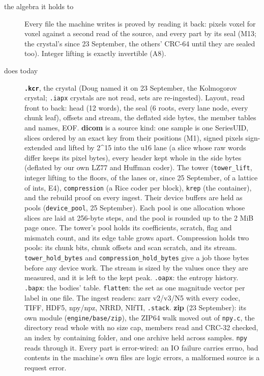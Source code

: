 \begin{description}
\item[{the algebra it holds to}] Every file the machine writes is proved by reading it back: pixels voxel for voxel against a second read of the source, and every part by its seal (M13; the crystal's since 23 September, the others' CRC-64 until they are sealed too). Integer lifting is exactly invertible (A8).
\item[{does today}] \textbf{\texttt{.\allowbreak{}kcr}}, the crystal (Doug named it on 23 September, the Kolmogorov crystal; \texttt{.\allowbreak{}iapx} crystals are not read, sets are re-ingested). Layout, read front to back: head (12 words), the seal (6 roots, every lane node, every chunk leaf), offsets and stream, the deflated side bytes, the member tables and names, EOF. \textbf{dicom} is a source kind: one sample is one SeriesUID, slices ordered by an exact key from their positions (M1), signed pixels sign-extended and lifted by 2\textasciicircum{}15 into the u16 lane (a slice whose raw words differ keeps its pixel bytes), every header kept whole in the side bytes (deflated by our own LZ77 and Huffman coder). The tower (\texttt{tower\_\allowbreak{}lift}, integer lifting to the floors, of the lanes or, since 25 September, of a lattice of ints, E4), \texttt{compression} (a Rice coder per block), \texttt{krep} (the container), and the rebuild proof on every ingest. Their device buffers are held as pools (\texttt{device\_\allowbreak{}pool}, 25 September). Each pool is one allocation whose slices are laid at 256-byte steps, and the pool is rounded up to the 2 MiB page once. The tower's pool holds its coefficients, scratch, flag and mismatch count, and its edge table grows apart. Compression holds two pools: its chunk bits, chunk offsets and scan scratch, and its stream. \texttt{tower\_\allowbreak{}hold\_\allowbreak{}bytes} and \texttt{compression\_\allowbreak{}hold\_\allowbreak{}bytes} give a job those bytes before any device work. The stream is sized by the values once they are measured, and it is left to the kept peak. \texttt{.\allowbreak{}oapx}: the entropy history. \texttt{.\allowbreak{}bapx}: the bodies' table. \texttt{flatten}: the set as one magnitude vector per label in one file. The ingest readers: zarr v2/v3/N5 with every codec, TIFF, HDF5, npy/npz, NRRD, NIfTI, \texttt{.\allowbreak{}stack}. \textbf{zip} (23 September): its own module (\texttt{engine/\allowbreak{}base/\allowbreak{}zip}), the ZIP64 walk moved out of \texttt{npy.\allowbreak{}c}, the directory read whole with no size cap, members read and CRC-32 checked, an index by containing folder, and one archive held across samples. \texttt{npy} reads through it. Every part is error-wired: an IO failure carries errno, bad contents in the machine's own files are logic errors, a malformed source is a request error.

\end{description}
